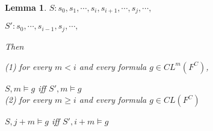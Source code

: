 \documentclass[12pt]{article}
\newtheorem{lemma}{Lemma}
\begin{document}
\begin{lemma}
$S: s_0, s_1, \cdots, s_i, s_{i+1}, \cdots, s_j, \cdots,$

$S': s_0, \cdots, s_{i-1}, s_j, \cdots, $

Then 

(1) for every $m <i$ and every formula $g\in CL^m(F^C)$, 

$S,m\models g$ iff $S',m\models g$\\

(2) for every $m\geq i$ and every formula $g\in CL(F^C)$

$S, j+m\models g$ iff $S', i+m\models g$

\end{lemma}
\end{document}
